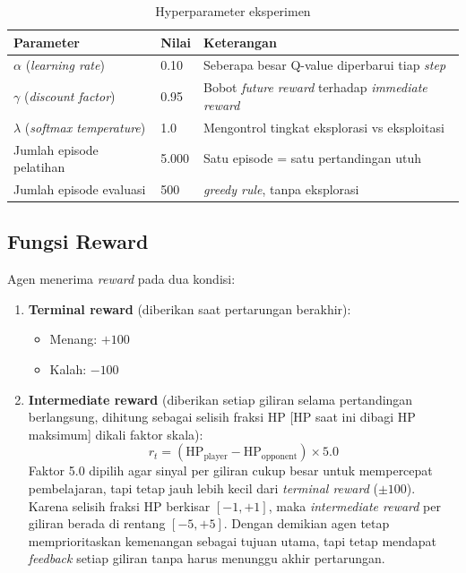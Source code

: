 \documentclass[11pt,a4paper,oneside]{report}
\begin{document}
\begin{table}[h!]
\centering
\caption{Hyperparameter eksperimen}
\label{tab:hyperparam}
\begin{tabular}{lll}
\toprule
\textbf{Parameter} & \textbf{Nilai} & \textbf{Keterangan} \\
\midrule
$\alpha$ (\textit{learning rate})     & 0.10  & Seberapa besar Q-value diperbarui tiap \textit{step} \\
$\gamma$ (\textit{discount factor})   & 0.95  & Bobot \textit{future reward} terhadap \textit{immediate reward} \\
$\lambda$ (\textit{softmax temperature}) & 1.0 & Mengontrol tingkat eksplorasi vs eksploitasi \\
Jumlah episode pelatihan              & 5.000 & Satu episode = satu pertandingan utuh \\
Jumlah episode evaluasi               & 500   & \textit{greedy rule}, tanpa eksplorasi \\
\bottomrule
\end{tabular}
\end{table}

\subsection*{Fungsi Reward}

Agen menerima \textit{reward} pada dua kondisi:

\begin{enumerate}[leftmargin=*]
    \item \textbf{Terminal reward} (diberikan saat pertarungan berakhir):
    \begin{itemize}
        \item Menang: $+100$
        \item Kalah: $-100$
    \end{itemize}
    \item \textbf{Intermediate reward} (diberikan setiap giliran selama pertandingan berlangsung, dihitung sebagai selisih fraksi HP [HP saat ini dibagi HP maksimum] dikali faktor skala):
    \begin{equation}
    r_t = (\text{HP}_{\text{player}} - \text{HP}_{\text{opponent}}) \times 5.0
    \end{equation}
    Faktor 5.0 dipilih agar sinyal per giliran cukup besar untuk mempercepat pembelajaran, tapi tetap jauh lebih kecil dari \textit{terminal reward} ($\pm 100$). Karena selisih fraksi HP berkisar $[-1, +1]$, maka \textit{intermediate reward} per giliran berada di rentang $[-5, +5]$. Dengan demikian agen tetap memprioritaskan kemenangan sebagai tujuan utama, tapi tetap mendapat \textit{feedback} setiap giliran tanpa harus menunggu akhir pertarungan.
\end{enumerate}
\end{document}
